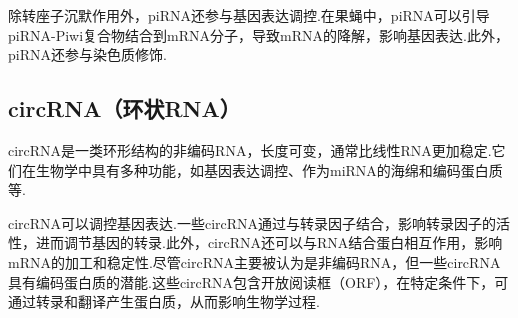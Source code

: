 除转座子沉默作用外，piRNA还参与基因表达调控.在果蝇中，piRNA可以引导piRNA-Piwi复合物结合到mRNA分子，导致mRNA的降解，影响基因表达.此外，piRNA还参与染色质修饰.

\subsection{circRNA（环状RNA）}
circRNA是一类环形结构的非编码RNA，长度可变，通常比线性RNA更加稳定.它们在生物学中具有多种功能，如基因表达调控、作为miRNA的海绵和编码蛋白质等.

circRNA可以调控基因表达.一些circRNA通过与转录因子结合，影响转录因子的活性，进而调节基因的转录.此外，circRNA还可以与RNA结合蛋白相互作用，影响mRNA的加工和稳定性.尽管circRNA主要被认为是非编码RNA，但一些circRNA具有编码蛋白质的潜能.这些circRNA包含开放阅读框（ORF），在特定条件下，可通过转录和翻译产生蛋白质，从而影响生物学过程.
